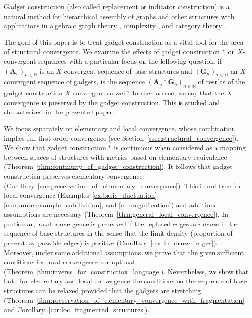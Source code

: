 \documentclass[11pt]{article}
\theoremstyle{plain}
\theoremstyle{definition}
\theoremstyle{remark}
\newcommand{\N}{\mathbb{N}}
\newcommand{\str}[1]{\mathbf{#1}}
\begin{document}
Gadget construction (also called replacement or indicator construction) is a natural method for hierarchical assembly of graphs and other structures with applications in algebraic graph theory \cite{frucht}\cite{hedrlin_pultr}\cite{hell_nesetril}, complexity \cite{garey_johnson}\cite{feder_vardi}, and category theory \cite{pultr_trnkova}\cite{nesetril_ossona_de_mendez_categories}\cite{hubicka_nesetril}.

The goal of this paper is to treat gadget construction as a vital tool for the area of structural convergence.
We examine the effects of gadget construction $*$ on $X$-convergent sequences with a particular focus on the following question:
if $(\str{A}_n)_{n \in \N}$ is an $X$-convergent sequence of base structures and $(\str{G}_n)_{n \in \N}$ an $X$-convergent sequence of gadgets, is the sequence $(\str{A}_n * \str{G}_n)_{n \in \N}$ of results of the gadget construction $X$-convergent as well?
In such a case, we say that the $X$-convergence is preserved by the gadget construction.
This is studied and characterized in the presented paper.

We focus separately on elementary and local convergence, whose combination implies full first-order convergence (see Section~\ref{ssec:structural_convergence}).
We show that gadget construction $*$ is continuous when considered as a mapping between spaces of structures with metrics based on elementary equivalence (Theorem~\ref{thm:continuity_of_gadget_construction}).
It follows that gadget construction preserves elementary convergence (Corollary~\ref{cor:preservation_of_elementary_convergence}).
This is not true for local convergence (Examples~\ref{ex:basic_fluctuation}, \ref{ex:counterexample_subdivision}, and \ref{ex:magnification}) and additional assumptions are necessary (Theorem~\ref{thm:general_local_convergence}).
In particular, local convergence is preserved if the replaced edges are \emph{dense} in the sequence of base structures in the sense that the limit density (proportion of present vs. possible edges) is positive (Corollary~\ref{cor:fo_dense_edges}).
Moreover, under some additional assumptions, we prove that the given sufficient conditions for local convergence are optimal (Theorem~\ref{thm:inverse_for_construction_language}).
Nevertheless, we show that both for elementary and local convergence the conditions on the sequence of base structures can be relaxed provided that the gadgets are stretching (Theorem~\ref{thm:preservation_of_elementary_convergence_with_fragmentation} and Corollary~\ref{cor:loc_fragmented_structures}).
\end{document}

